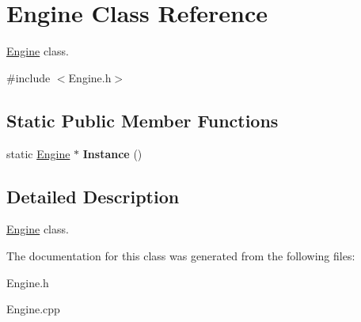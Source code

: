 \hypertarget{class_engine}{\section{Engine Class Reference}
\label{class_engine}
}


\hyperlink{class_engine}{Engine} class.  




{\ttfamily \#include $<$Engine.\-h$>$}

\subsection*{Static Public Member Functions}
\begin{DoxyCompactItemize}
\item 
\hypertarget{class_engine_a441d8865fcbaff2ace41286bbf775b7e}{static \hyperlink{class_engine}{Engine} $\ast$ {\bfseries Instance} ()}\label{class_engine_a441d8865fcbaff2ace41286bbf775b7e}

\end{DoxyCompactItemize}


\subsection{Detailed Description}
\hyperlink{class_engine}{Engine} class. 

The documentation for this class was generated from the following files\-:\begin{DoxyCompactItemize}
\item 
Engine.\-h\item 
Engine.\-cpp\end{DoxyCompactItemize}
